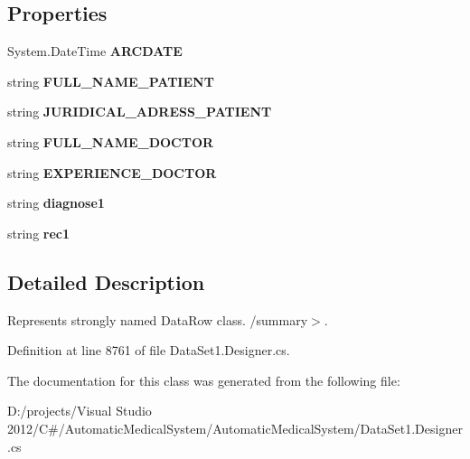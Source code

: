 \subsection*{Properties}
\begin{CompactItemize}
\item 
System.DateTime \textbf{ARCDATE}\hspace{0.3cm}{\tt  [get, set]}\label{class_automatic_medical_system_1_1_data_set1_1_1_r_e_p_o_r_t_f_a_m_i_l_y_d_o_c_t_o_r_s_row_b90cb5a2306e0d25b2540bea6def9041}

\item 
string \textbf{FULL\_\-NAME\_\-PATIENT}\hspace{0.3cm}{\tt  [get, set]}\label{class_automatic_medical_system_1_1_data_set1_1_1_r_e_p_o_r_t_f_a_m_i_l_y_d_o_c_t_o_r_s_row_7295755adfb065036bb4e50aa3f64a90}

\item 
string \textbf{JURIDICAL\_\-ADRESS\_\-PATIENT}\hspace{0.3cm}{\tt  [get, set]}\label{class_automatic_medical_system_1_1_data_set1_1_1_r_e_p_o_r_t_f_a_m_i_l_y_d_o_c_t_o_r_s_row_ec510c67a1e24eecc96c2749180c5449}

\item 
string \textbf{FULL\_\-NAME\_\-DOCTOR}\hspace{0.3cm}{\tt  [get, set]}\label{class_automatic_medical_system_1_1_data_set1_1_1_r_e_p_o_r_t_f_a_m_i_l_y_d_o_c_t_o_r_s_row_302338a5035017bd851beea88a7cd610}

\item 
string \textbf{EXPERIENCE\_\-DOCTOR}\hspace{0.3cm}{\tt  [get, set]}\label{class_automatic_medical_system_1_1_data_set1_1_1_r_e_p_o_r_t_f_a_m_i_l_y_d_o_c_t_o_r_s_row_9ff9955786812c3043e2a259bf934458}

\item 
string \textbf{diagnose1}\hspace{0.3cm}{\tt  [get, set]}\label{class_automatic_medical_system_1_1_data_set1_1_1_r_e_p_o_r_t_f_a_m_i_l_y_d_o_c_t_o_r_s_row_3836357b91d2b14887d83518254ce655}

\item 
string \textbf{rec1}\hspace{0.3cm}{\tt  [get, set]}\label{class_automatic_medical_system_1_1_data_set1_1_1_r_e_p_o_r_t_f_a_m_i_l_y_d_o_c_t_o_r_s_row_33ca642cfcb4f38ebbba66c93d765608}

\end{CompactItemize}


\subsection{Detailed Description}
Represents strongly named DataRow class. /summary$>$. 

Definition at line 8761 of file DataSet1.Designer.cs.

The documentation for this class was generated from the following file:\begin{CompactItemize}
\item 
D:/projects/Visual Studio 2012/C\#/AutomaticMedicalSystem/AutomaticMedicalSystem/DataSet1.Designer.cs\end{CompactItemize}
